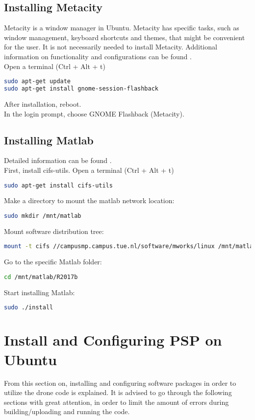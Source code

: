 \subsection{Installing Metacity}
Metacity is a window manager in Ubuntu. Metacity has specific tasks, such as window management, keyboard shortcuts and themes, that might be convenient for the user. It is not necessarily needed to install Metacity. Additional information on functionality and configurations can be found \cite{Metacity}.\\
Open a terminal (Ctrl + Alt + t)
\begin{lstlisting}[language=sh]
sudo apt-get update
sudo apt-get install gnome-session-flashback
\end{lstlisting}
After installation, reboot.\\
In the login prompt, choose GNOME Flashback (Metacity).
\subsection{Installing Matlab}
Detailed information can be found \cite{Matlab_Install}.\\
First, install cifs-utils. Open a terminal (Ctrl + Alt + t)
\begin{lstlisting}[language=sh]
sudo apt-get install cifs-utils
\end{lstlisting}
Make a directory to mount the matlab network location:
\begin{lstlisting}[language=sh]
sudo mkdir /mnt/matlab
\end{lstlisting}
Mount software distribution tree:
\begin{lstlisting}[language=sh]
mount -t cifs //campusmp.campus.tue.nl/software/mworks/linux /mnt/matlab -o username=<yourusernamehere> 
\end{lstlisting}
Go to the specific Matlab folder:
\begin{lstlisting}[language=sh]
cd /mnt/matlab/R2017b
\end{lstlisting}
Start installing Matlab:
\begin{lstlisting}[language=sh]
sudo ./install
\end{lstlisting}
\section{Install and Configuring PSP on Ubuntu}
From this section on, installing and configuring software packages in order to utilize the drone code is explained. It is advised to go through the following sections with great attention, in order to limit the amount of errors during building/uploading and running the code.
